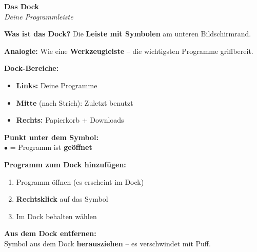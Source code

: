 \documentclass[a4paper,landscape,8pt]{extarticle}
\begin{document}
\hfill%
\begin{minipage}[t]{0.32\linewidth}
\begin{center}
\colorbox{dockgray!15}{%
\begin{minipage}{0.95\linewidth}
\vspace{2mm}
\begin{center}
{\Large\bfseries\textcolor{dockgray}{Das Dock}}\\[1pt]
{\footnotesize\itshape Deine Programmleiste}
\end{center}
\vspace{2mm}
\end{minipage}%
}
\end{center}

\vspace{1mm}

\textbf{Was ist das Dock?} Die \textbf{Leiste mit Symbolen} am unteren Bildschirmrand.

\textbf{Analogie:} Wie eine \textbf{Werkzeugleiste} -- die wichtigsten Programme griffbereit.

\textbf{Dock-Bereiche:}
\begin{itemize}
\item \textbf{Links:} Deine Programme
\item \textbf{Mitte} (nach Strich): Zuletzt benutzt
\item \textbf{Rechts:} Papierkorb + Downloads
\end{itemize}

\textbf{Punkt unter dem Symbol:}\\
$\bullet$ = Programm ist \textbf{geöffnet}

\textbf{Programm zum Dock hinzufügen:}
\begin{enumerate}
\item Programm öffnen (es erscheint im Dock)
\item \textbf{Rechtsklick} auf das Symbol
\item \glqq Im Dock behalten\grqq{} wählen
\end{enumerate}

\textbf{Aus dem Dock entfernen:}\\
Symbol aus dem Dock \textbf{herausziehen} -- es verschwindet mit \glqq Puff\grqq{}.

\end{minipage}

\vspace{1mm}

\begin{center}
\end{center}
\end{document}
